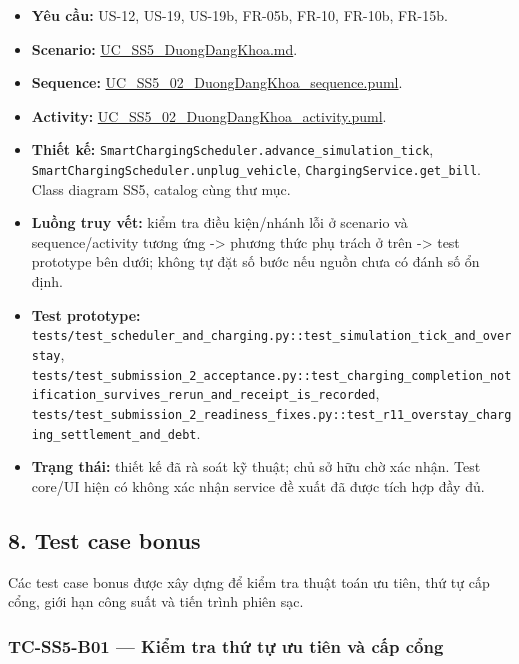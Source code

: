 \documentclass[11pt,a4paper]{article}
\providecommand{\tightlist}{%
  \setlength{\itemsep}{0pt}\setlength{\parskip}{0pt}}
\begin{document}
\begin{itemize}
\tightlist
\item
  \textbf{Yêu cầu:} US-12, US-19, US-19b, FR-05b, FR-10, FR-10b, FR-15b.
\item
  \textbf{Scenario:}
  \href{../../../../docs/diagrams/Use-case\%20detail-scenario/SS5/Usecase\%20scenario/UC_SS5_DuongDangKhoa.md}{UC\_SS5\_DuongDangKhoa.md}.
\item
  \textbf{Sequence:}
  \href{../../../../docs/diagrams/Use-case\%20detail-scenario/SS5/Sequence\%20diagrams/UC_SS5_02_DuongDangKhoa_sequence.puml}{UC\_SS5\_02\_DuongDangKhoa\_sequence.puml}.
\item
  \textbf{Activity:}
  \href{../../../../docs/diagrams/Use-case\%20detail-scenario/SS5/Activity\%20diagrams/UC_SS5_02_DuongDangKhoa_activity.puml}{UC\_SS5\_02\_DuongDangKhoa\_activity.puml}.
\item
  \textbf{Thiết kế:}
  \texttt{SmartChargingScheduler.advance\_simulation\_tick},
  \texttt{SmartChargingScheduler.unplug\_vehicle},
  \texttt{ChargingService.get\_bill}. Class diagram SS5, catalog cùng
  thư mục.
\item
  \textbf{Luồng truy vết:} kiểm tra điều kiện/nhánh lỗi ở scenario và
  sequence/activity tương ứng -\textgreater{} phương thức phụ trách ở
  trên -\textgreater{} test prototype bên dưới; không tự đặt số bước nếu
  nguồn chưa có đánh số ổn định.
\item
  \textbf{Test prototype:}
  \texttt{tests/test\_scheduler\_and\_charging.py::test\_simulation\_tick\_and\_overstay},
  \texttt{tests/test\_submission\_2\_acceptance.py::test\_charging\_completion\_notification\_survives\_rerun\_and\_receipt\_is\_recorded},
  \texttt{tests/test\_submission\_2\_readiness\_fixes.py::test\_r11\_overstay\_charging\_settlement\_and\_debt}.
\item
  \textbf{Trạng thái:} thiết kế đã rà soát kỹ thuật; chủ sở hữu chờ xác
  nhận. Test core/UI hiện có không xác nhận service đề xuất đã được tích
  hợp đầy đủ.
\end{itemize}

\hypertarget{test-case-bonus}{%
\subsection{8. Test case bonus}\label{test-case-bonus}}

Các test case bonus được xây dựng để kiểm tra thuật toán ưu tiên, thứ tự
cấp cổng, giới hạn công suất và tiến trình phiên sạc.

\hypertarget{tc-ss5-b01-kiux1ec3m-tra-thux1ee9-tux1ef1-ux1b0u-tiuxean-vuxe0-cux1ea5p-cux1ed5ng}{%
\subsubsection{TC-SS5-B01 --- Kiểm tra thứ tự ưu tiên và cấp
cổng}\label{tc-ss5-b01-kiux1ec3m-tra-thux1ee9-tux1ef1-ux1b0u-tiuxean-vuxe0-cux1ea5p-cux1ed5ng}}
\end{document}
